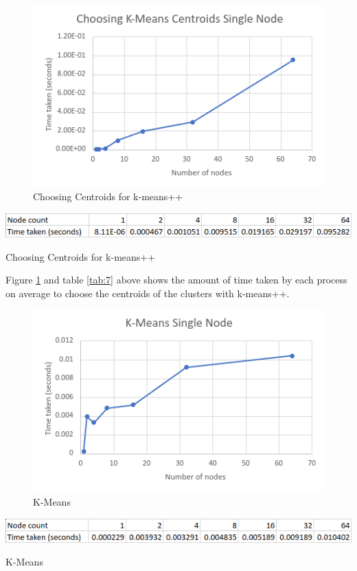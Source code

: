 \documentclass{article}
\begin{document}
\clearpage
\begin{figure}[!htb]
\includegraphics[width=\textwidth]{single-node/choose-centroids.png}
\caption{Choosing Centroids for k-means++}
\label{fig:7}
\end{figure}
\begin{table}[!htb]
\includegraphics[width=\textwidth]{single-node/choose-centroids-table.png}
\caption{Choosing Centroids for k-means++}
\label{tab:7}
\end{table}

Figure \ref{fig:7} and table \ref{tab:7} above shows the amount of time taken by each process on
average to choose the centroids of the clusters with k-means++.

\clearpage
\begin{figure}[!htb]
\includegraphics[width=\textwidth]{single-node/k-means.png}
\caption{K-Means}
\label{fig:8}
\end{figure}
\begin{table}[!htb]
\includegraphics[width=\textwidth]{single-node/k-means-table.png}
\caption{K-Means}
\label{tab:8}
\end{table}
\end{document}
